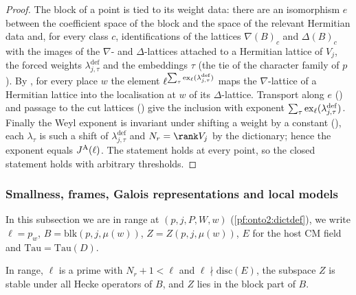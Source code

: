 \begin{proof}
The block of a point is tied to its weight data: there are an isomorphism $e$ between the coefficient space of the block and the
space of the relevant Hermitian data and, for every class $c$, identifications of the lattices $\nabla(B)_c$ and $\Delta(B)_c$ with the
images of the $\nabla$- and $\Delta$-lattices attached to a Hermitian lattice of $V_j$, the forced weights
$\lambda^{\mathrm{def}}_{j,\tau}$ and the embeddings $\tau$ (the tie of the character family of $p$). By
, for every place $w$ the element
$\ell^{\sum_\tau\operatorname{ex}_\ell(\lambda^{\mathrm{def}}_{j,\tau})}$ maps the $\nabla$-lattice of a Hermitian lattice into the localisation at
$w$ of its $\Delta$-lattice. Transport along $e$ () and passage to the cut lattices
() give the inclusion with exponent $\sum_\tau\operatorname{ex}_\ell(\lambda^{\mathrm{def}}_{j,\tau})$.
Finally the Weyl exponent is invariant under shifting a weight by a constant (), each
$\lambda_\tau$ is such a shift of $\lambda^{\mathrm{def}}_{j,\tau}$ and $N_r=\rank V_j$ by the dictionary; hence the exponent equals
$J^{\mathrm{A}}(\ell)$. The statement holds at every point, so the closed statement holds with arbitrary thresholds.
\end{proof}

\subsubsection{Smallness, frames, Galois representations and local models}\label{sec:pf:onto2:four}

In this subsection we are in range at $(p,j,P,W,w)$ (\cref{pf:onto2:dictdef}), we write $\ell=p_w$, $B=\mathrm{blk}(p,j,\mu(w))$,
$Z=Z(p,j,\mu(w))$, $E$ for the host CM field and $\mathrm{Tau}=\mathrm{Tau}(D)$.

\begin{proposition}[Smallness]\label{pf:onto2:small}
In range, $\ell$ is a prime with $N_r+1<\ell$ and $\ell\nmid\mathrm{disc}(E)$, the subspace $Z$ is stable under all Hecke operators of
$B$, and $Z$ lies in the block part of $B$.
\end{proposition}

